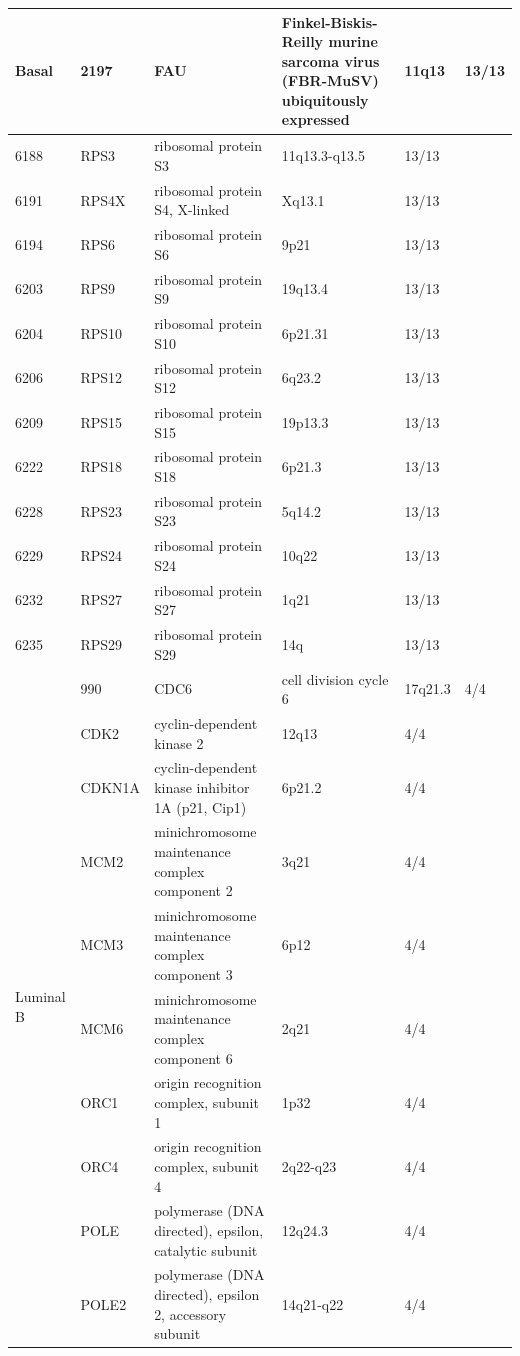 \documentclass[11pt]{article}
\begin{document}
\begin{table}
\begin{tabular}{|l|l|l|l|l|l|}
\multirow{13}{*}{Basal} & 2197 & FAU & Finkel-Biskis-Reilly murine sarcoma virus (FBR-MuSV) ubiquitously expressed & 11q13 & 13/13 \\
\hline
6188 & RPS3 & ribosomal protein S3 & 11q13.3-q13.5 & 13/13 \\
\hline
6191 & RPS4X & ribosomal protein S4, X-linked & Xq13.1 & 13/13 \\
\hline
6194 & RPS6 & ribosomal protein S6 & 9p21 & 13/13 \\
\hline
6203 & RPS9 & ribosomal protein S9 & 19q13.4 & 13/13 \\
\hline
6204 & RPS10 & ribosomal protein S10 & 6p21.31 & 13/13 \\
\hline
6206 & RPS12 & ribosomal protein S12 & 6q23.2 & 13/13 \\
\hline
6209 & RPS15 & ribosomal protein S15 & 19p13.3 & 13/13 \\
\hline
6222 & RPS18 & ribosomal protein S18 & 6p21.3 & 13/13 \\
\hline
6228 & RPS23 & ribosomal protein S23 & 5q14.2 & 13/13 \\
\hline
6229 & RPS24 & ribosomal protein S24 & 10q22 & 13/13 \\
\hline
6232 & RPS27 & ribosomal protein S27 & 1q21 & 13/13 \\
\hline
6235 & RPS29 & ribosomal protein S29 & 14q & 13/13 \\
\hline
\multirow{32}{*}{Luminal B} & 990 & CDC6 & cell division cycle 6 & 17q21.3 & 4/4 \\
\hline
1017 & CDK2 & cyclin-dependent kinase 2 & 12q13 & 4/4 \\
\hline
1026 & CDKN1A & cyclin-dependent kinase inhibitor 1A (p21, Cip1) & 6p21.2 & 4/4 \\
\hline
4171 & MCM2 & minichromosome maintenance complex component 2 & 3q21 & 4/4 \\
\hline
4172 & MCM3 & minichromosome maintenance complex component 3 & 6p12 & 4/4 \\
\hline
4175 & MCM6 & minichromosome maintenance complex component 6 & 2q21 & 4/4 \\
\hline
4998 & ORC1 & origin recognition complex, subunit 1 & 1p32 & 4/4 \\
\hline
5000 & ORC4 & origin recognition complex, subunit 4 & 2q22-q23 & 4/4 \\
\hline
5426 & POLE & polymerase (DNA directed), epsilon, catalytic subunit & 12q24.3 & 4/4 \\
\hline
5427 & POLE2 & polymerase (DNA directed), epsilon 2, accessory subunit & 14q21-q22 & 4/4 \\

\end{tabular}
\end{table}
\end{document}
